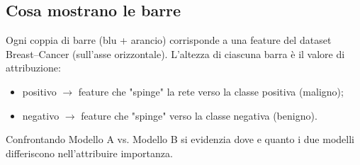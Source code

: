 \documentclass[a4paper,11pt]{article}
\begin{document}
\subsection*{Cosa mostrano le barre}
Ogni coppia di barre (blu + arancio) corrisponde a una feature del dataset Breast–Cancer (sull’asse orizzontale). 
L’altezza di ciascuna barra è il valore di attribuzione:
\begin{itemize}
  \item positivo $\to$ feature che "spinge" la rete verso la classe positiva (maligno);
  \item negativo $\to$ feature che "spinge" verso la classe negativa (benigno).
\end{itemize}
Confrontando Modello A vs. Modello B si evidenzia dove e quanto i due modelli differiscono nell'attribuire importanza.
\end{document}
